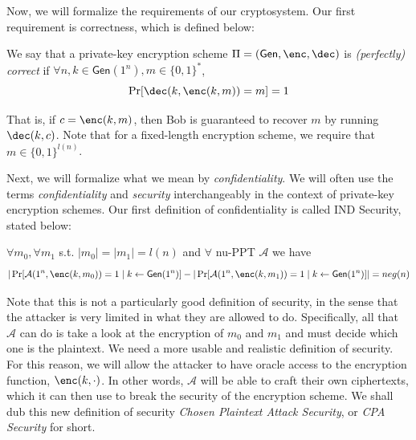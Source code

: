 \documentclass[12pt]{tufte-book}
\newcommand{\ma}{\mathcal{A}}
\newcommand{\bit}{\{0,1\}}
\newcommand{\gen}{\mathsf{Gen}}
\begin{document}

Now, we will formalize the requirements of our cryptosystem.
Our first requirement is correctness, which is defined below:

\begin{definition}
    We say that a private-key encryption scheme $\Pi = (\gen, \enc, \dec)$ is \emph{(perfectly) correct} if 
    $\forall n, k \in \gen(1^n), m \in \{0,1\}^{*}$,
    $$\Pr[\dec(k,\enc(k,m)) = m] = 1$$
\end{definition}
That is, if $c = \enc(k, m)$, then Bob is guaranteed to recover $m$ by running $\dec(k, c)$. Note that for a fixed-length encryption scheme, we require that $m \in \bit^{l(n)}$.

Next, we will formalize what we mean by \textit{confidentiality}.
We will often use the terms \textit{confidentiality} and \textit{security} interchangeably in the context of private-key encryption schemes.
Our first definition of confidentiality is called IND Security, stated below:

\begin{definition}
    $\forall m_0, \forall m_1$ s.t. $|m_0| = |m_1|= l(n)$ and $\forall$ nu-PPT $\ma$ we have
    $$|\Pr[\ma(1^n, \enc(k, m_0)) = 1 \; | \; k \leftarrow \gen(1^n)] - |\Pr[\ma(1^n, \enc(k, m_1)) = 1 \; | \; k \leftarrow \gen(1^n)]| = neg(n)$$ 
\end{definition}
Note that this is not a particularly good definition of security, in the sense that the attacker is very limited in what they are allowed to do.
Specifically, all that $\ma$ can do is take a look at the encryption of $m_0$ and $m_1$ and must decide which one is the plaintext.
We need a more usable and realistic definition of security.
For this reason, we will allow the attacker to have oracle access to the encryption function, $\enc(k, \cdot)$.
In other words, $\ma$ will be able to craft their own ciphertexts, which it can then use to break the security of the encryption scheme.
We shall dub this new definition of security \textit{Chosen Plaintext Attack Security}, or \textit{CPA Security} for short.
\end{document}
